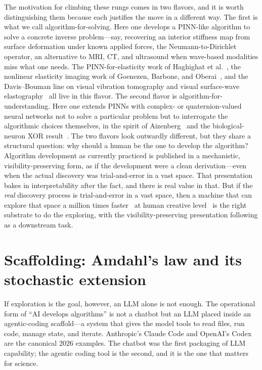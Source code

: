 \documentclass[11pt]{article}
\begin{document}
The motivation for climbing these rungs comes in two flavors, and it is worth distinguishing them because each justifies the move in a different way. The first is what we call algorithm-for-solving. Here one develops a PINN-like algorithm to solve a concrete inverse problem---say, recovering an interior stiffness map from surface deformation under known applied forces, the Neumann-to-Dirichlet operator, an alternative to MRI, CT, and ultrasound when wave-based modalities miss what one needs. The PINN-for-elasticity work of Haghighat et al.~\cite{haghighat2021solid}, the nonlinear elasticity imaging work of Goenezen, Barbone, and Oberai~\cite{goenezen2011nonlinear}, and the Davis--Bouman line on visual vibration tomography and visual surface-wave elastography~\cite{davis2015visual,davis2014microphone} all live in this flavor. The second flavor is algorithm-for-understanding. Here one extends PINNs with complex- or quaternion-valued neural networks not to solve a particular problem but to interrogate the algorithmic choices themselves, in the spirit of Aizenberg~\cite{aizenberg2007mlmvn} and the biological-neuron XOR result~\cite{gidon2020dendritic}. The two flavors look outwardly different, but they share a structural question: why should a human be the one to develop the algorithm? Algorithm development as currently practiced is published in a mechanistic, visibility-preserving form, as if the development were a clean derivation---even when the actual discovery was trial-and-error in a vast space. That presentation bakes in interpretability after the fact, and there is real value in that. But if the \emph{real} discovery process is trial-and-error in a vast space, then a machine that can explore that space a million times faster~\cite{schwartz2022interpretable} at human creative level~\cite{hubert2024creative,guzik2023torrance} is the right substrate to do the exploring, with the visibility-preserving presentation following as a downstream task.

\section{Scaffolding: Amdahl's law and its stochastic extension}

If exploration is the goal, however, an LLM alone is not enough. The operational form of ``AI develops algorithms'' is not a chatbot but an LLM placed inside an agentic-coding scaffold---a system that gives the model tools to read files, run code, manage state, and iterate. Anthropic's Claude Code and OpenAI's Codex are the canonical 2026 examples. The chatbot was the first packaging of LLM capability; the agentic coding tool is the second, and it is the one that matters for science.
\end{document}
